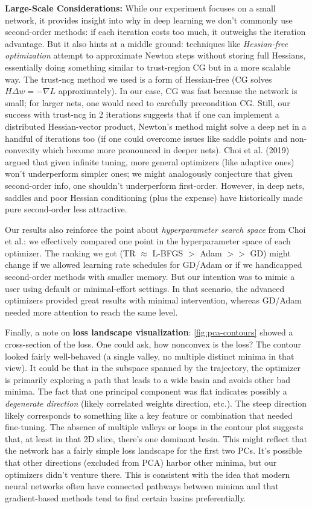 \documentclass[12pt]{article}
\begin{document}
\textbf{Large-Scale Considerations:} While our experiment focuses on a small network, it provides insight into why in deep learning we don’t commonly use second-order methods: if each iteration costs too much, it outweighs the iteration advantage. But it also hints at a middle ground: techniques like \emph{Hessian-free optimization} \cite{Martens2010HF} attempt to approximate Newton steps without storing full Hessians, essentially doing something similar to trust-region CG but in a more scalable way. The trust-ncg method we used is a form of Hessian-free (CG solves $H \Delta w = -\nabla L$ approximately). In our case, CG was fast because the network is small; for larger nets, one would need to carefully precondition CG. Still, our success with trust-ncg in 2 iterations suggests that if one can implement a distributed Hessian-vector product, Newton’s method might solve a deep net in a handful of iterations too (if one could overcome issues like saddle points and non-convexity which become more pronounced in deeper nets). Choi et al. (2019) argued that given infinite tuning, more general optimizers (like adaptive ones) won’t underperform simpler ones; we might analogously conjecture that given second-order info, one shouldn’t underperform first-order. However, in deep nets, saddles and poor Hessian conditioning (plus the expense) have historically made pure second-order less attractive.

Our results also reinforce the point about \emph{hyperparameter search space} from Choi et al.: we effectively compared one point in the hyperparameter space of each optimizer. The ranking we got (TR $\approx$ L-BFGS $>$ Adam $>>$ GD) might change if we allowed learning rate schedules for GD/Adam or if we handicapped second-order methods with smaller memory. But our intention was to mimic a user using default or minimal-effort settings. In that scenario, the advanced optimizers provided great results with minimal intervention, whereas GD/Adam needed more attention to reach the same level.

Finally, a note on \textbf{loss landscape visualization}: \cref{fig:pca-contours} showed a cross-section of the loss. One could ask, how nonconvex is the loss? The contour looked fairly well-behaved (a single valley, no multiple distinct minima in that view). It could be that in the subspace spanned by the trajectory, the optimizer is primarily exploring a path that leads to a wide basin and avoids other bad minima. The fact that one principal component was flat indicates possibly a \emph{degenerate direction} (likely correlated weights direction, etc.). The steep direction likely corresponds to something like a key feature or combination that needed fine-tuning. The absence of multiple valleys or loops in the contour plot suggests that, at least in that 2D slice, there’s one dominant basin. This might reflect that the network has a fairly simple loss landscape for the first two PCs. It’s possible that other directions (excluded from PCA) harbor other minima, but our optimizers didn’t venture there. This is consistent with the idea that modern neural networks often have connected pathways between minima and that gradient-based methods tend to find certain basins preferentially.
\end{document}
